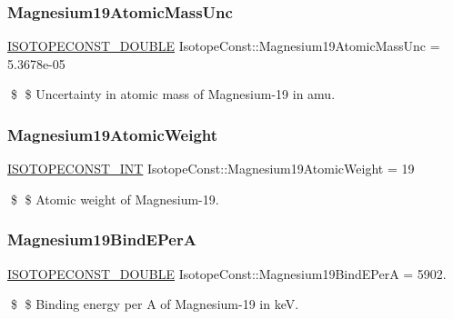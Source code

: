 \subsubsection{\texorpdfstring{Magnesium19\+Atomic\+Mass\+Unc}{Magnesium19AtomicMassUnc}}
{\footnotesize\ttfamily \mbox{\hyperlink{group___isotope_const-_macros_ga8f45a7272ce02c0b4c65c44636ed719a}{I\+S\+O\+T\+O\+P\+E\+C\+O\+N\+S\+T\+\_\+\+D\+O\+U\+B\+LE}} Isotope\+Const\+::\+Magnesium19\+Atomic\+Mass\+Unc = 5.\+3678e-\/05}

\$ \$ Uncertainty in atomic mass of Magnesium-\/19 in amu. \mbox{\label{group___isotope_const-_magnesium-_mg19_gaec25f071e62dcce420ed7f7690a7ff18}} 
\subsubsection{\texorpdfstring{Magnesium19\+Atomic\+Weight}{Magnesium19AtomicWeight}}
{\footnotesize\ttfamily \mbox{\hyperlink{group___isotope_const-_macros_ga5f18360b3e99483a35c32d789e62621c}{I\+S\+O\+T\+O\+P\+E\+C\+O\+N\+S\+T\+\_\+\+I\+NT}} Isotope\+Const\+::\+Magnesium19\+Atomic\+Weight = 19}

\$ \$ Atomic weight of Magnesium-\/19. \mbox{\label{group___isotope_const-_magnesium-_mg19_ga77b06227962bb4e22b844874379843e7}} 
\subsubsection{\texorpdfstring{Magnesium19\+Bind\+E\+PerA}{Magnesium19BindEPerA}}
{\footnotesize\ttfamily \mbox{\hyperlink{group___isotope_const-_macros_ga8f45a7272ce02c0b4c65c44636ed719a}{I\+S\+O\+T\+O\+P\+E\+C\+O\+N\+S\+T\+\_\+\+D\+O\+U\+B\+LE}} Isotope\+Const\+::\+Magnesium19\+Bind\+E\+PerA = 5902.}

\$ \$ Binding energy per A of Magnesium-\/19 in keV. \mbox{\label{group___isotope_const-_magnesium-_mg19_ga4899e76e8028c501a2656a300c011fb9}} 
